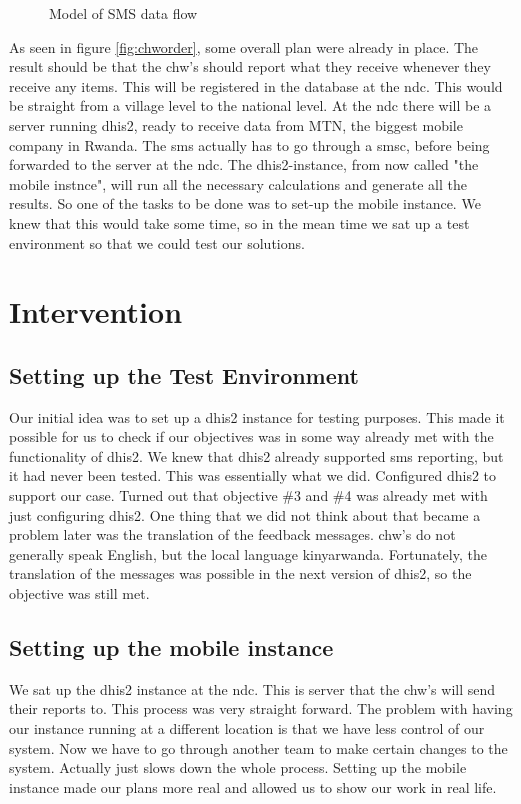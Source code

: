 \begin{figure}
\centering

\caption{Model of SMS data flow}
\label{fig:smsdataflow}
\end{figure}

As seen in figure \ref{fig:chworder}, some overall plan were already in place. The result should be that the \gls{chw}'s should report what they receive whenever they receive any items. This will be registered in the database at the \gls{ndc}. 
This would be straight from a village level to the national level. At the \gls{ndc} there will be a server running \gls{dhis2}, ready to receive data from MTN, the biggest mobile company in Rwanda. The \gls{sms} actually has to go through a \gls{smsc}, before being forwarded to the server at the \gls{ndc}. 
The \gls{dhis2}-instance, from now called "the mobile instnce", will run all the necessary calculations and generate all the results. 
So one of the tasks to be done was to set-up the mobile instance. 
We knew that this would take some time, so in the mean time we sat up a test environment so that we could test our solutions. 


\section{Intervention}

\subsection{Setting up the Test Environment}
Our initial idea was to set up a \gls{dhis2} instance for testing purposes. This made it possible for us to check if our objectives was in some way already met with the functionality of \gls{dhis2}. We knew that \gls{dhis2} already supported \gls{sms} reporting, but it had never been tested. This was essentially what we did. Configured \gls{dhis2} to support our case. Turned out that objective \#3 and \#4 was already met with just configuring \gls{dhis2}. One thing that we did not think about that became a problem later was the translation of the feedback messages. \gls{chw}'s do not generally speak English, but the local language kinyarwanda. Fortunately, the translation of the messages was possible in the next version of \gls{dhis2}, so the objective was still met. 

\subsection{Setting up the mobile instance}
We sat up the \gls{dhis2} instance at the \gls{ndc}. This is server that the \gls{chw}'s will send their reports to. This process was very straight forward. The problem with having our instance running at a different location is that we have less control of our system. Now we have to go through another team to make certain changes to the system. Actually just slows down the whole process. Setting up the mobile instance made our plans more real and allowed us to show our work in real life. 


